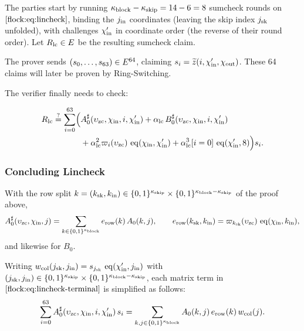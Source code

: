 \vspace{2mm}

The parties start by running $\kappa_{\mathrm{block}} - \kappa_{\mathrm{skip}} = 14 - 6 = 8$ sumcheck rounds on $\eqref{flock:eq:lincheck}$, binding the $j_{\mathrm{in}}$ coordinates (leaving the skip index $j_{\mathrm{sk}}$ unfolded), with challenges $\chi'_{\mathrm{in}}$ in coordinate order (the reverse of their round order). Let $R_{\mathrm{lc}}\in E$ be the resulting sumcheck claim.

The prover sends $(s_0,\ldots,s_{63})\in E^{64}$, claiming $s_i=\widetilde{z}(i,\chi'_{\mathrm{in}},\chi_{\mathrm{out}})$. These 64 claims will later be proven by Ring-Switching.

The verifier finally needs to check:

\begin{equation}\label{flock:eq:lincheck-terminal}
\begin{split}
R_{\mathrm{lc}}\stackrel{?}{=}\sum_{i=0}^{63}\Bigl(&A^{\sharp}_0(\upsilon_{\mathrm{zc}},\chi_{\mathrm{in}},i,\chi'_{\mathrm{in}})+\alpha_{\mathrm{lc}}\,B^{\sharp}_0(\upsilon_{\mathrm{zc}},\chi_{\mathrm{in}},i,\chi'_{\mathrm{in}})\\
&+\alpha_{\mathrm{lc}}^2\varpi_i(\upsilon_{\mathrm{zc}})\,\operatorname{eq}(\chi_{\mathrm{in}},\chi'_{\mathrm{in}})+\alpha_{\mathrm{lc}}^3[i=0]\,\operatorname{eq}(\chi'_{\mathrm{in}},8)\Bigr)s_i.
\end{split}
\end{equation}

\subsubsection{Concluding Lincheck}\label{flock:native}


With the row split $k=(k_{\mathrm{sk}},k_{\mathrm{in}}) \in\{0,1\}^{\kappa_{\mathrm{skip}}} \times \{0,1\}^{\kappa_{\mathrm{block}}-\kappa_{\mathrm{skip}}}$ of the proof above,
\begin{equation}\label{flock:eq:erow}
A^{\sharp}_0(\upsilon_{\mathrm{zc}},\chi_{\mathrm{in}},j)=\sum_{k\in\{0,1\}^{\kappa_{\mathrm{block}}}}e_{\mathrm{row}}(k)\,A_0(k,j),\qquad
e_{\mathrm{row}}(k_{\mathrm{sk}},k_{\mathrm{in}})=\varpi_{k_{\mathrm{sk}}}(\upsilon_{\mathrm{zc}})\,\operatorname{eq}(\chi_{\mathrm{in}},k_{\mathrm{in}}),
\end{equation}
and likewise for $B_0$.

Writing $w_{\mathrm{col}}(j_{\mathrm{sk}},j_{\mathrm{in}})=s_{j_{\mathrm{sk}}}\,\operatorname{eq}(\chi'_{\mathrm{in}},j_{\mathrm{in}})$ with $(j_{\mathrm{sk}},j_{\mathrm{in}}) \in\{0,1\}^{\kappa_{\mathrm{skip}}} \times \{0,1\}^{\kappa_{\mathrm{block}}-\kappa_{\mathrm{skip}}}$, each matrix term in $\eqref{flock:eq:lincheck-terminal}$ is simplified as follows:
\begin{equation}\label{flock:eq:matrix-form}
\sum_{i=0}^{63}A^{\sharp}_0(\upsilon_{\mathrm{zc}},\chi_{\mathrm{in}},i,\chi'_{\mathrm{in}})\,s_i=\sum_{k,j\in\{0,1\}^{\kappa_{\mathrm{block}}}}A_0(k,j)\,e_{\mathrm{row}}(k)\,w_{\mathrm{col}}(j).
\end{equation}

